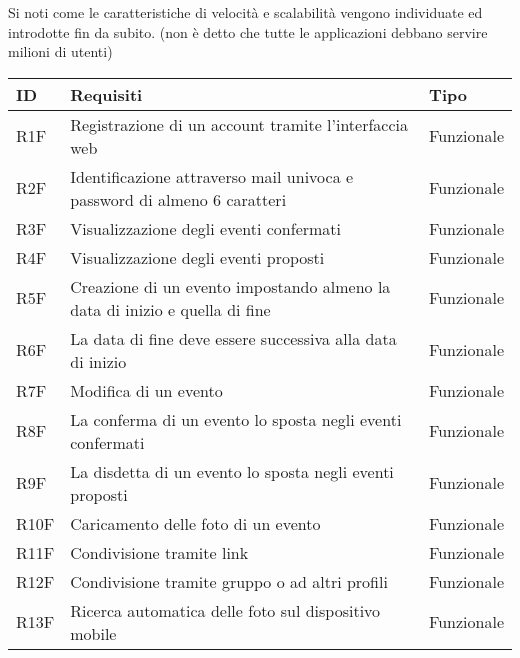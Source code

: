 Si noti come le caratteristiche di velocità e scalabilità vengono individuate ed introdotte fin da subito.
(non è detto che tutte le applicazioni debbano servire milioni di utenti)
\begin{table}
    \begin{tabular} {|P{1.3cm}|P{11.2cm}|P{3cm}|}
        \hline
        \textbf{ID} & \textbf{Requisiti}                                                          & \textbf{Tipo}  \\
        \hline
        R1F         & Registrazione di un account tramite l’interfaccia web                       & Funzionale     \\
        \hline
        R2F         & Identificazione attraverso mail univoca e password di almeno 6 caratteri    & Funzionale     \\
        \hline
        R3F         & Visualizzazione degli eventi confermati                                     & Funzionale     \\
        \hline
        R4F         & Visualizzazione degli eventi proposti                                       & Funzionale     \\
        \hline
        R5F         & Creazione di un evento impostando almeno la data di inizio e quella di fine & Funzionale     \\
        \hline
        R6F         & La data di fine deve essere successiva alla data di inizio                  & Funzionale     \\
        \hline
        R7F         & Modifica di un evento                                                       & Funzionale     \\
        \hline
        R8F         & La conferma di un evento lo sposta negli eventi confermati                  & Funzionale     \\
        \hline
        R9F         & La disdetta di un evento lo sposta negli eventi proposti                    & Funzionale     \\
        \hline
        R10F        & Caricamento delle foto di un evento                                         & Funzionale     \\
        \hline
        R11F        & Condivisione tramite link                                                   & Funzionale     \\
        \hline
        R12F        & Condivisione tramite gruppo o ad altri profili                              & Funzionale     \\
        \hline
        R13F        & Ricerca automatica delle foto sul dispositivo mobile                        & Funzionale     \\

\end{tabular}
\end{table}
